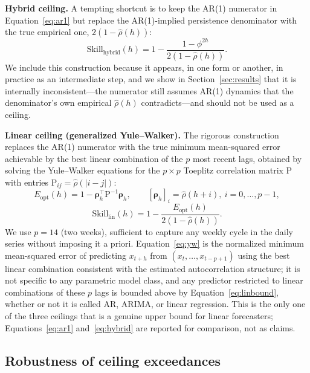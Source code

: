 \documentclass{article}
\begin{document}
\textbf{Hybrid ceiling.}
A tempting shortcut is to keep the AR(1) numerator in Equation~\ref{eq:ar1}
but replace the AR(1)-implied persistence denominator with the true empirical
one, $2(1-\hat\rho(h))$:
\begin{equation}
  \mathrm{Skill}_{\mathrm{hybrid}}(h) = 1 - \frac{1-\phi^{2h}}{2(1-\hat\rho(h))}.
  \label{eq:hybrid}
\end{equation}
We include this construction because it appears, in one form or another, in
practice as an intermediate step, and we show in Section~\ref{sec:results}
that it is internally inconsistent---the numerator still assumes AR(1)
dynamics that the denominator's own empirical $\hat\rho(h)$ contradicts---and
should not be used as a ceiling.

\textbf{Linear ceiling (generalized Yule--Walker).}
The rigorous construction replaces the AR(1) numerator with the true minimum
mean-squared error achievable by the best linear combination of the $p$ most
recent lags, obtained by solving the Yule--Walker equations for the $p\times
p$ Toeplitz correlation matrix $\mathrm{P}$ with entries $\mathrm{P}_{ij}=
\hat\rho(|i-j|)$:
\begin{equation}
  E_{\mathrm{opt}}(h) = 1 - \boldsymbol{\rho}_h^\top \mathrm{P}^{-1}
  \boldsymbol{\rho}_h, \qquad
  [\boldsymbol{\rho}_h]_i = \hat\rho(h+i),\ i=0,\dots,p-1,
  \label{eq:yw}
\end{equation}
\begin{equation}
  \mathrm{Skill}_{\mathrm{lin}}(h) = 1 -
  \frac{E_{\mathrm{opt}}(h)}{2(1-\hat\rho(h))}.
  \label{eq:linbound}
\end{equation}
We use $p=14$ (two weeks), sufficient to capture any weekly cycle in the daily
series without imposing it a priori.
Equation~\ref{eq:yw} is the normalized minimum mean-squared error of
predicting $x_{t+h}$ from $(x_t,\dots,x_{t-p+1})$ using the best linear
combination consistent with the estimated autocorrelation structure; it is
not specific to any parametric model class, and any predictor restricted to
linear combinations of these $p$ lags is bounded above by
Equation~\ref{eq:linbound}, whether or not it is called AR, ARIMA, or linear
regression.
This is the only one of the three ceilings that is a genuine upper bound for
linear forecasters; Equations~\ref{eq:ar1} and~\ref{eq:hybrid} are reported
for comparison, not as claims.

\subsection{Robustness of ceiling exceedances}
\label{sec:bootstrap_method}
\end{document}
